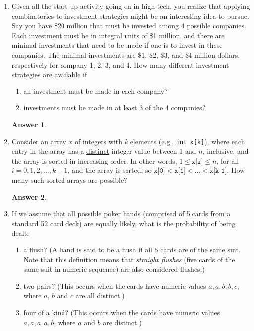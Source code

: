 \documentclass[12pt]{article}
\renewcommand{\(}{\left(}
\renewcommand{\)}{\right)}
\theoremstyle{definition}
\newtheorem*{answer}{Answer}
\begin{document}
\begin{enumerate}
\item Given all the start-up activity going on in high-tech, you realize that applying combinatorics to investment strategies might be an interesting idea to pursue.  Say you have \$20 million that must be invested among 4 possible companies.  Each investment must be in integral units of \$1 million, and there are minimal investments that need to be made if one is to invest in these companies.  The minimal investments are \$1, \$2, \$3, and \$4 million dollars, respectively for company 1, 2, 3, and 4.  How many different investment strategies are available if
    \begin{enumerate}[label=\alph*.]

    \item an investment must be made in each company?
    \item investments must be made in at least 3 of the 4 companies?

    \end{enumerate}

    \begin{shaded}
    \begin{answer}

    \end{answer}
    \end{shaded}
    \newpage


\item Consider an array $x$ of integers with $k$ elements (e.g., \texttt{int x[k]}), where each entry in the array has a \underline{distinct} integer value between 1 and $n$, inclusive, and the array is sorted in increasing order. In other words, $1 \leq \texttt{x[i]} \leq n$, for all $i = 0, 1, 2, \dotsc, k - 1$, and the array is sorted, so $\texttt{x[0]} < \texttt{x[1]} < \dotsc < \texttt{x[k-1]}$.  How many such sorted arrays are possible?

    \begin{shaded}
    \begin{answer}

    \end{answer}
    \end{shaded}
    \newpage


\item If we assume that all possible poker hands (comprised of 5 cards from a standard 52 card deck) are equally likely, what is the probability of being dealt:
    \begin{enumerate}[label=\alph*.]

    \item a flush?  (A hand is said to be a flush if all 5 cards are of the same suit.  Note that this definition means that \emph{straight flushes} (five cards of the same suit in numeric sequence) are also considered flushes.)
    \item two pairs?  (This occurs when the cards have numeric values $a, a, b, b, c$, where $a$, $b$ and $c$ are all distinct.)
    \item four of a kind?  (This occurs when the cards have numeric values $a, a, a, a, b$, where $a$ and $b$ are distinct.)


\end{enumerate}
\end{enumerate}
\end{document}
